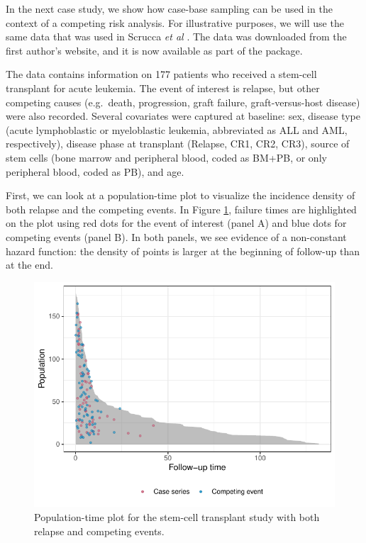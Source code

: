 \documentclass[
]{jss}
\begin{document}
In the next case study, we show how case-base sampling can be used in
the context of a competing risk analysis. For illustrative purposes, we
will use the same data that was used in Scrucca \emph{et al}
\citeyearpar{scrucca2010regression}. The data was downloaded from the
first author's website, and it is now available as part of the
 package.

The data contains information on 177 patients who received a stem-cell
transplant for acute leukemia. The event of interest is relapse, but
other competing causes (e.g.~death, progression, graft failure,
graft-versus-host disease) were also recorded. Several covariates were
captured at baseline: sex, disease type (acute lymphoblastic or
myeloblastic leukemia, abbreviated as ALL and AML, respectively),
disease phase at transplant (Relapse, CR1, CR2, CR3), source of stem
cells (bone marrow and peripheral blood, coded as BM+PB, or only
peripheral blood, coded as PB), and age.

First, we can look at a population-time plot to visualize the incidence
density of both relapse and the competing events. In Figure
\ref{fig:compPop}, failure times are highlighted on the plot using red
dots for the event of interest (panel A) and blue dots for competing
events (panel B). In both panels, we see evidence of a non-constant
hazard function: the density of points is larger at the beginning of
follow-up than at the end.

\begin{CodeChunk}
\begin{figure}

{\centering \includegraphics[width=\textwidth,keepaspectratio=true]{../figures/compPop-1} 

}

\caption[Population-time plot for the stem-cell transplant study with both relapse and competing events]{Population-time plot for the stem-cell transplant study with both relapse and competing events.}\label{fig:compPop}
\end{figure}
\end{CodeChunk}
\end{document}
